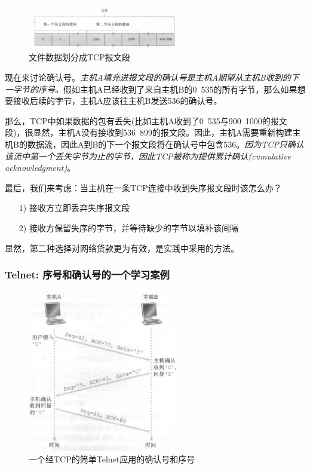 \begin{figure}[!htbp]
    \centering
    \includegraphics[width=0.6\textwidth]{image/chapter03/文件数据划分成TCP报文段.png}
    \caption{文件数据划分成TCP报文段}
\end{figure}

    现在来讨论确认号。\emph{主机A填充进报文段的确认号是主机A期望从主机B收到的下一字节的序号。}假如主机A已经收到了来自主机B的0~535的所有字节，那么如果想要接收后续的字节，主机A应该往主机B发送536的确认号。

    那么，TCP中如果数据的包有丢失(比如主机A收到了0~535与900~1000的报文段)，很显然，主机A没有接收到536~899的报文段。因此，主机A需要重新构建主机B的数据流，因此A到B的下一个报文段将在确认号中包含536。\emph{因为TCP只确认该流中第一个丢失字节为止的字节，因此TCP被称为提供累计确认(cumulative acknowledgment)}。

    最后，我们来考虑：当主机在一条TCP连接中收到失序报文段时该怎么办？

\begin{itemize}
    \item [1)] 接收方立即丢弃失序报文段
    \item [2)] 接收方保留失序的字节，并等待缺少的字节以填补该间隔
\end{itemize}

    显然，第二种选择对网络贷款更为有效，是实践中采用的方法。

\subsubsection{Telnet: 序号和确认号的一个学习案例}

\begin{figure}[!htbp]
    \centering
    \includegraphics[width=0.6\textwidth]{image/chapter03/经TCP的简单Telnet链接.png}
    \caption{一个经TCP的简单Telnet应用的确认号和序号}
\end{figure}

